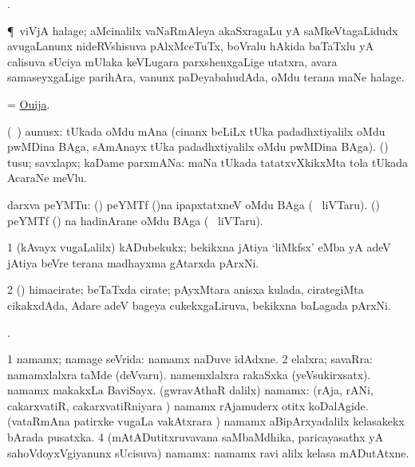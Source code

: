 \bentry
{}
\gl{\saMkiSx}
\bmng
{}. 
\emng
\eentry

\bentry
{}
\gl{\nA}
\bmng
\P\ viVjA halage; aMcinalilx vaNaRmAleya akaSxragaLu yA saMkeVtagaLidudx avugaLanunx nideRVshisuva pAlxMceTuTx, boVralu hAkida baTaTxlu yA calisuva sUciya mUlaka keVLugara parxshenxgaLige utatxra, avara samaseyxgaLige parihAra, \mo vanunx paDeyabahudAda, oMdu terana maNe halage. 
\emng
\eentry

\bentry
{}
\gl{\nA}
\bmng
= \hyperlink{Ouija}{Ouija}. 
\emng
\eentry

\bentry
{}
\gl{\nA}
\bmng
(\saMkiSx\ ) aunusx: 
\banum
{} tUkada oMdu mAna (cinanx beLiLx tUka padadhxtiyalilx oMdu pwMDina \eng{$\frac\bg 1\eg/\bg 12\eg$} BAga, sAmAnayx tUka padadhxtiyalilx oMdu pwMDina \eng{$\frac\bg 1\eg/\bg 16\eg$} BAga). 
 (\rUpa) tusu; savxlapx; kaDame parxmANa:  maNa tUkada tatatxvXkikxMta tola tUkada AcaraNe meVlu. 
\eanum
\emng

\noindent
\gl{\pagu}
\bmng
{} darxva peYMTu: 
\banum
{} (\birx) peYMTf ()na ipapxtatxneV oMdu BAga (\su\  liVTaru). 
 (\ame) peYMTf () na hadinArane oMdu BAga (\su\  liVTaru). 
\eanum
\emng
\eentry

\bentry
{}
\gl{\nA}
\bmng
\bnum
\num{1} (kAvayx \mo vugaLalilx) kADubekukx; bekikxna jAtiya `liMkfsx' eMba yA adeV jAtiya beVre terana madhayxma gAtarxda pArxNi. 
\num{2} (\pArxparx) himacirate; beTaTxda cirate; pAyxMtara anisxa kulada, cirategiMta cikakxdAda, Adare adeV bageya cukekxgaLiruva, bekikxna baLagada pArxNi.   
\enum
\emng
\eentry

\bentry
{}
\gl{\saMkiSx}
\bmng
{}. 
\emng
\eentry

\bentry
{}
\bmng
\bnum
\num{1} namamx; namage seVrida:  namamx naDuve idAdxne. 
\num{2} elalxra; savaRra:  namamxlalxra taMde (deVvaru).  namemxlalxra rakaSxka (yeVsukirxsatx).  namamx makakxLa BaviSayx. 
 (gwravAthaR \bava dalilx) namamx: 
\banum
{} (rAja, rANi, cakarxvatiR, cakarxvatiRniyara \vi)  namamx rAjamuderx otitx koDalAgide. 
 (vataRmAna patirxke \mo vugaLa vakAtxrara \vi)  namamx aBipArxyadalilx kelasakekx bArada pusatxka. 
\eanum
\numie
\num{4} (mAtADutitxruvavana saMbaMdhika, paricayasathx yA sahoVdoyxVgiyanunx sUcisuva) namamx:  namamx ravi alilx kelasa mADutAtxne. 
\enum
\emng

